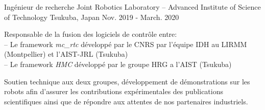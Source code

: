 
\begin{cventries}

  \cventry
    {Ingénieur de recherche} %
    {Joint Robotics Laboratory -- Advanced Institute of Science of Technology} %
    {Tsukuba, Japan} %
    {Nov. 2019 - March. 2020} %
    {
      \begin{cvitems} %
        \item Responsable de la fusion des logiciels de contrôle entre:\\
          -- Le framework \emph{mc\_rtc} développé par le CNRS par l'équipe IDH au LIRMM (Montpellier) et l'AIST-JRL (Tsukuba)\\
          -- Le framework \emph{HMC} développé par le groupe HRG a l'AIST (Tsukuba)
        \item Soutien technique aux deux groupes, développement de démonstrations sur les robots afin d'assurer les contributions expérimentales des publications scientifiques ainsi que de répondre aux attentes de nos partenaires industriels.
      \end{cvitems}
    }


\end{cventries}
